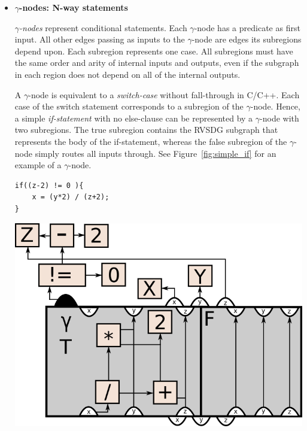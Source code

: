 \begin{itemize}

\item \textbf{$\gamma$-nodes: N-way statements}

\textit{$\gamma$-nodes} represent conditional statements. Each $\gamma$-node has
a predicate as first input. All other edges passing as inputs to the
$\gamma$-node are edges its subregions depend upon. Each subregion represents
one case. All subregions must have the same order and arity of internal inputs
and outputs, even if the subgraph in each region does not depend on all of the
internal outputs.

A $\gamma$-node is equivalent to a \textit{switch-case} without fall-through in
C/C++. Each case of the switch statement corresponds to a subregion of the
$\gamma$-node. Hence, a simple \textit{if-statement} with no else-clause can be
represented by a $\gamma$-node with two subregions. The true subregion contains
the RVSDG subgraph that represents the body of the if-statement, whereas the
false subregion of the $\gamma$-node simply routes all inputs through. See
Figure~\ref{fig:simple_if} for an example of a $\gamma$-node.

\begin{centering}
	\noindent\begin{minipage}{0.36\textwidth}
		\begin{CenteredBox}
		\begin{lstlisting}[label={lst:simple_if}, style=minipage_customcpp,
basicstyle=\fontsize{10}{1}]
if((z-2) != 0 ){
	x = (y*2) / (z+2);
}
		\end{lstlisting}
		\end{CenteredBox}
	\end{minipage}
	\noindent\begin{minipage}{0.55\textwidth}
		\captionsetup{type=figure}
		\includegraphics[width=\textwidth]{figures/simple_if_example}
	\end{minipage}
	\label{fig:simple_if}
\end{centering}


\end{itemize}
